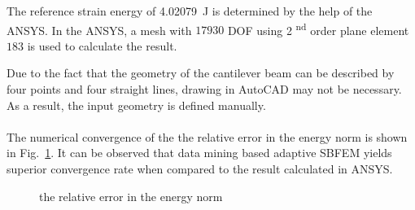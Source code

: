 The reference strain energy of \SI{4.02079}{\joule} is determined by the help of the ANSYS.
In the ANSYS, a mesh with $17930$ DOF using 2 \textsuperscript{nd} order plane element $183$ is used to calculate the result.

Due to the fact that the geometry of the cantilever beam can be described by four points and four straight lines, drawing in AutoCAD may not be necessary.
As a result, the input geometry is defined manually.


\paragraph{}
The numerical convergence of the the relative error in the energy norm is shown in Fig.~\ref{adap_fig:ex_short_cantilever_convergence}.
It can be observed that data mining based adaptive SBFEM yields superior convergence rate when compared to the result calculated in ANSYS.

\begin{figure}[h!]
    \centering
    \caption{the relative error in the energy norm}
    \label{adap_fig:ex_short_cantilever_convergence}
\end{figure}

